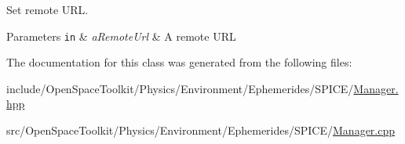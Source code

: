 Set remote U\+RL. 


\begin{DoxyParams}[1]{Parameters}
\mbox{\tt in}  & {\em a\+Remote\+Url} & A remote U\+RL \\
\hline
\end{DoxyParams}


The documentation for this class was generated from the following files\+:\begin{DoxyCompactItemize}
\item 
include/\+Open\+Space\+Toolkit/\+Physics/\+Environment/\+Ephemerides/\+S\+P\+I\+C\+E/\hyperlink{_environment_2_ephemerides_2_s_p_i_c_e_2_manager_8hpp}{Manager.\+hpp}\item 
src/\+Open\+Space\+Toolkit/\+Physics/\+Environment/\+Ephemerides/\+S\+P\+I\+C\+E/\hyperlink{_environment_2_ephemerides_2_s_p_i_c_e_2_manager_8cpp}{Manager.\+cpp}\end{DoxyCompactItemize}
